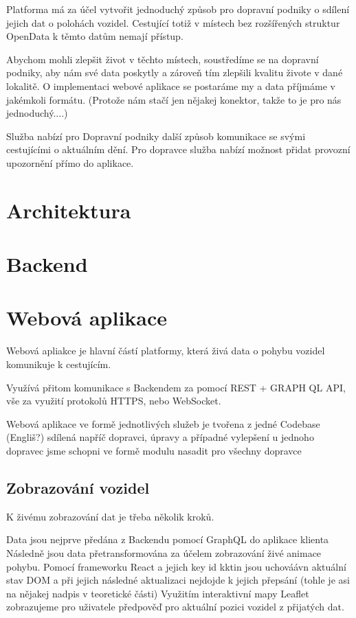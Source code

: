 Platforma má za účel vytvořit jednoduchý způsob pro dopravní podniky o sdílení jejich dat o polohách vozidel.
Cestující totiž v místech bez rozšířených struktur OpenData k těmto datům nemají přístup.

Abychom mohli zlepšit život v těchto místech, soustředíme se na dopravní podniky, aby nám své data poskytly a zároveň tím zlepšili kvalitu živote v dané lokalitě.
O implementaci webové aplikace se postaráme my a data příjmáme v jakémkoli formátu. (Protože nám stačí jen nějakej konektor, takže to je pro nás jednoduchý....)

Služba nabízí pro Dopravní podniky další způsob komunikace se svými cestujícími o aktuálním dění. Pro dopravce služba nabízí možnost přidat provozní upozornění přímo do aplikace.

\section{Architektura}

\section{Backend}

\section{Webová aplikace}

Webová apliakce je hlavní částí platformy, která živá data o pohybu vozidel komunikuje k cestujícím.

Využívá přitom komunikace s Backendem za pomocí REST + GRAPH QL API, vše za využití protokolů HTTPS, nebo WebSocket.



Webová aplikace ve formě jednotlivých služeb je tvořena z jedné Codebase (Engliš?) sdílená napříč dopravci, úpravy a případné vylepšení u jednoho dopravec jsme schopni ve formě modulu nasadit pro všechny dopravce


\subsection{Zobrazování vozidel}
K živému zobrazování dat je třeba několik kroků.

Data jsou nejprve předána z Backendu pomocí GraphQL do aplikace klienta
Následně jsou data přetransformována za účelem zobrazování živé animace pohybu.
Pomocí frameworku React a jejich key id kktin jsou uchováávn aktuální stav DOM a při jejich následné aktualizaci nejdojde k jejich přepsání (tohle je asi na nějakej nadpis v teoretické části)
Využitím interaktivní mapy Leaflet zobrazujeme pro uživatele předpověď pro aktuální pozici vozidel z přijatých dat.


